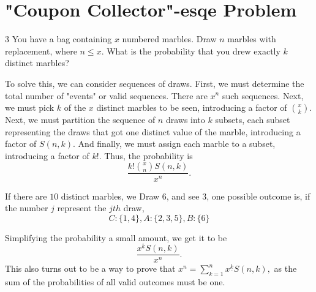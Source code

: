 \documentclass[11pt,twosided]{article}
\newcommand{\fallingfactorial}[1]{%
	^{\underline{#1}}%
}
\begin{document}
\section{"Coupon Collector"-esqe Problem}
\begin{problem}
	3 You have a bag containing $x$ numbered marbles. Draw $n$ marbles with replacement, where $n\leq x$. What is the probability that you drew exactly $k$ distinct marbles?
\end{problem}
\begin{solution}
To solve this, we can consider sequences of draws. First, we must determine the total number of "events" or valid sequences. There are $x^n$ such sequences. Next, we must pick $k$ of the $x$ distinct marbles to be seen, introducing a factor of ${x\choose k}.$ Next, we must partition the sequence of $n$ draws into $k$ subsets, each subset representing the draws that got one distinct value of the marble, introducing a factor of $S(n,k)$. And finally, we must assign each marble to a subset, introducing a factor of $k!.$ Thus, the probability is \[\frac{k!{x \choose n}S(n,k)}{x^n}.\]
\begin{example}
		If there are $10$ distinct marbles, we Draw $6$, and see $3$, one possible outcome is, if the number $j$ represent the $jth$ draw, \[C:\{1,4\},A:\{2,3,5\},B:\{6\}\]
		
\end{example}
Simplifying the probability a small amount, we get it to be \[\frac{x\fallingfactorial{k}S(n,k)}{x^n}.\]
This also turns out to be a way to prove that $x^n=\sum_{k=1}^{n}x\fallingfactorial{k}S(n,k),$ as the sum of the probabilities of all valid outcomes must be one.
\end{solution}
\end{document}
